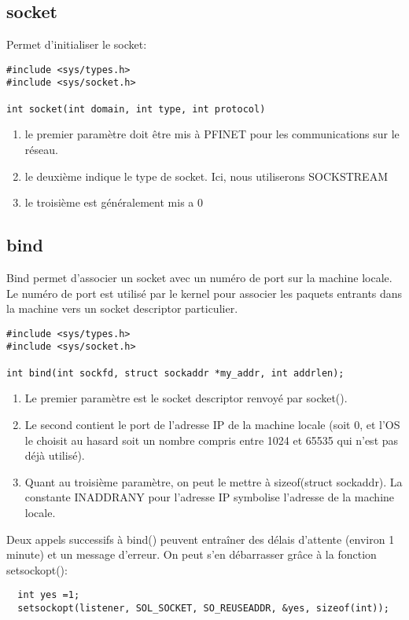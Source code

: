 \documentclass[a4paper]{article}
\begin{document}
\subsection{socket}
Permet d'initialiser le socket:
\begin{lstlisting}
#include <sys/types.h>
#include <sys/socket.h>

int socket(int domain, int type, int protocol)
\end{lstlisting}
\begin{enumerate}
  \item le premier paramètre doit être mis à PF\textunderscore{}INET pour les communications sur le réseau.
  \item le deuxième indique le type de socket. Ici, nous utiliserons SOCK\textunderscore{}STREAM
  \item le troisième est généralement mis a 0
\end{enumerate}
\subsection{bind}
Bind permet d'associer un socket avec un numéro de port sur la machine locale. Le numéro de port est utilisé par le kernel pour associer les paquets entrants dans la machine vers un socket descriptor particulier.
\begin{lstlisting}
#include <sys/types.h>
#include <sys/socket.h>

int bind(int sockfd, struct sockaddr *my_addr, int addrlen);
\end{lstlisting}
\begin{enumerate}
  \item Le premier paramètre est le socket descriptor renvoyé par socket().
  \item Le second contient le port de l'adresse IP de la machine locale (soit 0, et l'OS le choisit au hasard soit un nombre compris entre 1024 et 65535 qui n'est pas déjà utilisé).
  \item Quant au troisième paramètre, on peut le mettre à sizeof(struct sockaddr). La constante INADDR\textunderscore{}ANY pour l'adresse IP symbolise l'adresse de la machine locale.
\end{enumerate}
Deux appels successifs à bind() peuvent entraîner des délais d'attente (environ 1 minute) et un message d'erreur. On peut s'en débarrasser grâce à la fonction setsockopt():
\begin{lstlisting}
  int yes =1;
  setsockopt(listener, SOL_SOCKET, SO_REUSEADDR, &yes, sizeof(int));
\end{lstlisting}
\end{document}
